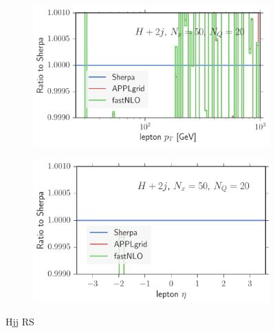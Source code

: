 \begin{figure}
\begin{subfigure}[]{0.49\textwidth}
	\includegraphics[width=\textwidth]{images/hjjrs_lpt.pdf}
\end{subfigure}
\hfill
\begin{subfigure}[]{0.49\textwidth}
	\includegraphics[width=\textwidth]{images/hjjrs_leta.pdf}
\end{subfigure}
\caption{Hjj RS}
\end{figure}
%
